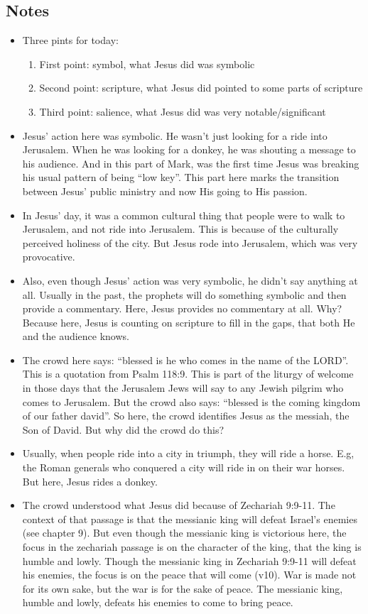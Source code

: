 \subsection*{Notes}
\begin{itemize}
  \item{Three pints for today:
  \begin{enumerate}
    \item{First point: symbol, what Jesus did was symbolic}
    \item{Second point: scripture, what Jesus did pointed to some parts of scripture}
    \item{Third point: salience, what Jesus did was very notable/significant}
  \end{enumerate}}
  \item{Jesus’ action here was symbolic. He wasn’t just looking for a ride into Jerusalem. When he was looking for a donkey, he was shouting a message to his audience. And in this part of Mark, was the first time Jesus was breaking his usual pattern of being “low key”. This part here marks the transition between Jesus’ public ministry and now His going to His passion.}
  \item{In Jesus’ day, it was a common cultural thing that people were to walk to Jerusalem,  and not ride into Jerusalem. This is because of the culturally perceived holiness of the city. But Jesus rode into Jerusalem, which was very provocative. }
  \item{Also, even though Jesus’ action was very symbolic, he didn’t say anything at all. Usually in the past, the prophets will do something symbolic and then provide a commentary. Here, Jesus provides no commentary at all. Why? Because here, Jesus is counting on scripture to fill in the gaps, that both He and the audience knows.}
  \item{The crowd here says: “blessed is he who comes in the name of the LORD”. This is a quotation from Psalm 118:9. This is part of the liturgy of welcome in those days that the Jerusalem Jews will say to any Jewish pilgrim who comes to Jerusalem. But the crowd also says: “blessed is the coming kingdom of our father david”. So here, the crowd identifies Jesus as the messiah, the Son of David. But why did the crowd do this?}
  \item{Usually, when people ride into a city in triumph, they will ride a horse. E.g, the Roman generals who conquered a city will ride in on their war horses. But here, Jesus rides a donkey. }
  \item{The crowd understood what Jesus did because of Zechariah 9:9-11. The context of that passage is that the messianic king will defeat Israel’s enemies (see chapter 9). But even though the messianic king is victorious here, the focus in the zechariah passage is on the character of the king, that the king is humble and lowly. Though the messianic king in Zechariah 9:9-11 will defeat his enemies, the focus is on the peace that will come (v10). War is made not for its own sake, but the war is for the sake of peace. The messianic king, humble and lowly, defeats his enemies to come to bring peace.}

\end{itemize}
